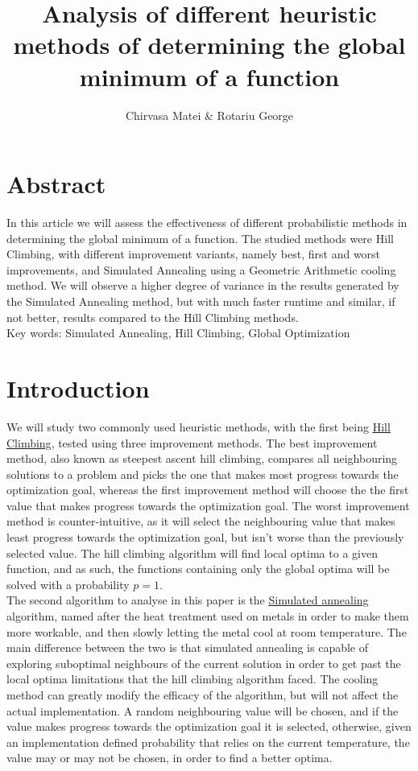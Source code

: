 \documentclass{article}
\author{Chirvasa Matei \& Rotariu George}
\title{Analysis of different heuristic methods of determining the global minimum of a function}
\begin{document}
\maketitle

\section{Abstract}
In this article we will assess the effectiveness of different probabilistic methods in determining the global minimum of a function. The studied methods were Hill Climbing, with different improvement variants, namely best, first and worst improvements, and Simulated Annealing using a Geometric Arithmetic cooling method. We will observe a higher degree of variance in the results generated by the Simulated Annealing method, but with much faster runtime and similar, if not better, results compared to the Hill Climbing methods. \\
Key words: Simulated Annealing, Hill Climbing, Global Optimization

\section{Introduction}
We will study two commonly used heuristic methods, with the first being \underline{\href{https://en.wikipedia.org/wiki/Hill_climbing}{Hill Climbing}}\cite{HC}, tested using three improvement methods. The best improvement method, also known as steepest ascent hill climbing, compares all neighbouring solutions to a problem and picks the one that makes most progress towards the optimization goal, whereas the first improvement method will choose the the first value that makes progress towards the optimization goal. The worst improvement method is counter-intuitive, as it will select the neighbouring value that makes least progress towards the optimization goal, but isn't worse than the previously selected value. The hill climbing algorithm will find local optima to a given function, and as such, the functions containing only the global optima will be solved with a probability $p=1$. \\
The second algorithm to analyse in this paper is the \underline{\href{https://en.wikipedia.org/wiki/Simulated_annealing}{Simulated annealing}}\cite{SA} algorithm, named after the heat treatment used on metals in order to make them more workable, and then slowly letting the metal cool at room temperature. The main difference between the two is that simulated annealing is capable of exploring suboptimal neighbours of the current solution in order to get past the local optima limitations that the hill climbing algorithm faced. The cooling method can greatly modify the efficacy of the algorithm, but will not affect the actual implementation. A random neighbouring value will be chosen, and if the value makes progress towards the optimization goal it is selected, otherwise, given an implementation defined probability that relies on the current temperature, the value may or may not be chosen, in order to find a better optima.
\end{document}
